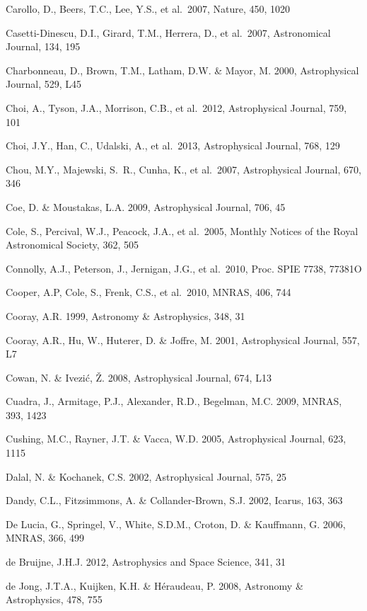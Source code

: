 \documentclass{emulateapj}
\begin{document}
\begin{thebibliography}{}
\bibitem[()]{} Carollo, D., Beers, T.C., Lee, Y.S., et al.~2007, Nature, 450, 1020	

\bibitem[()]{} Casetti-Dinescu, D.I., Girard, T.M., Herrera, D., et al.~2007, Astronomical Journal, 134, 195
	
\bibitem[()]{} Charbonneau, D., Brown, T.M., Latham, D.W. \& Mayor, M. 2000, Astrophysical Journal, 529, L45

\bibitem[()]{} Choi, A., Tyson, J.A., Morrison, C.B., et al.~2012, Astrophysical Journal, 759, 101 

\bibitem[()]{} Choi, J.Y., Han, C., Udalski, A., et al.~2013, Astrophysical Journal, 768, 129

\bibitem[()]{} Chou, M.Y., Majewski, S.~R., Cunha, K., et al.~2007, Astrophysical Journal, 670, 346

\bibitem[()]{} Coe, D. \& Moustakas, L.A. 2009, Astrophysical Journal, 706, 45 

\bibitem[()]{} Cole, S., Percival, W.J., Peacock, J.A., et al.~2005, Monthly Notices of the Royal 
             Astronomical Society, 362, 505

\bibitem[()]{} Connolly, A.J., Peterson, J., Jernigan, J.G., et al.~2010, Proc. SPIE 7738, 77381O

\bibitem[()]{} Cooper, A.P, Cole, S., Frenk, C.S., et al.~2010, MNRAS, 406, 744

\bibitem[()]{} Cooray, A.R. 1999, Astronomy \& Astrophysics, 348, 31
	
\bibitem[()]{} Cooray, A.R., Hu, W., Huterer, D. \& Joffre, M. 2001, Astrophysical Journal, 557, L7 

\bibitem[()]{} Cowan, N. \& Ivezi\'{c}, \v{Z}. 2008, Astrophysical Journal, 674, L13

\bibitem[()]{} Cuadra, J., Armitage, P.J., Alexander, R.D., Begelman, M.C. 2009, MNRAS, 393, 1423 

\bibitem[()]{} Cushing, M.C., Rayner, J.T. \& Vacca, W.D. 2005, Astrophysical Journal, 623, 1115

\bibitem[()]{} Dalal, N. \& Kochanek, C.S. 2002, Astrophysical Journal, 575, 25

\bibitem[()]{} Dandy, C.L., Fitzsimmons, A. \& Collander-Brown, S.J. 2002, Icarus, 163, 363  

\bibitem[()]{} De Lucia, G., Springel, V., White, S.D.M., Croton, D. \& Kauffmann, G. 2006, MNRAS, 366, 499
	
\bibitem[()]{} de Bruijne, J.H.J. 2012, Astrophysics and Space Science, 341, 31

\bibitem[()]{} de Jong, J.T.A., Kuijken, K.H. \& H\'{e}raudeau, P. 2008, Astronomy \& Astrophysics, 478, 755


\end{thebibliography}
\end{document}
